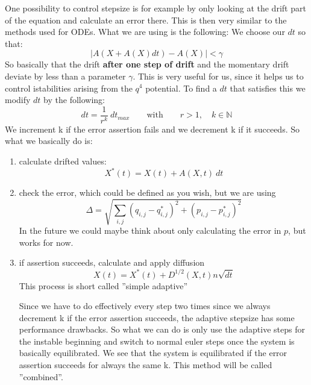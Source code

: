 	One possibility to control stepsize is for example by only looking at the drift part of the equation and calculate an error there. This is then very similar to the methods used for ODEs. What we are using is the following: We choose our $dt$ so that:
	\begin{equation}
		|A(X + A(X)dt) - A(X)| < \gamma
	\end{equation}
	So basically that the drift \textbf{after one step of drift} and the momentary drift deviate by less than a parameter $\gamma$. This is very useful for us, since it helps us to control istabilities arising from the $q^4$ potential. To find a $dt$ that satisfies this we modify $dt$ by the following:
	\begin{equation}
		dt =	\frac{1}{r^k}~ dt_{max} \qquad \text{with} \qquad r > 1, \quad k \in \mathbb{N}
	\end{equation}
	We increment k if the error assertion fails and we decrement k if it succeeds. So what we basically do is:
	\begin{enumerate}
		\item calculate drifted values:
		\begin{equation}
			X^*(t)	=	X(t) + A(X, t)~dt
		\end{equation}
		\item check the error, which could be defined as you wish, but we are using
		\begin{equation}
			\Delta =	\sqrt{\sum_{i, j} (q_{i,j} - q_{i,j}^*)^2 + (p_{i,j} - p_{i,j}^*)^2}
		\end{equation}
		In the future we could maybe think about only calculating the error in $p$, but works for now.
		\item if assertion succeeds, calculate and apply diffusion
		\begin{equation}
			X(t) =	X^*(t) + D^{1/2}(X, t) n \sqrt{dt}
		\end{equation}
		This process is short called ''simple adaptive''
		
		Since we have to do effectively every step two times since we always decrement k if the error assertion succeeds, the adaptive stepsize has some performance drawbacks. So what we can do is only use the adaptive steps for the instable beginning and switch to normal euler steps once the system is basically equilibrated. We see that the system is equilibrated if the error assertion succeeds for always the same k. This method will be called ''combined''.
	\end{enumerate}
	
